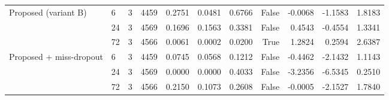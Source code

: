 \begin{table}
\begin{tabular}{llrrrrrrrrr}
\cline{1-11}
\multirow[t]{3}{*}{Proposed (variant B)} & 6 & 3 & 4459 & 0.2751 & 0.0481 & 0.6766 & False & -0.0068 & -1.1583 & 1.8183 \\
 & 24 & 3 & 4569 & 0.1696 & 0.1563 & 0.3381 & False & 0.4543 & -0.4554 & 1.3341 \\
 & 72 & 3 & 4566 & 0.0061 & 0.0002 & 0.0200 & True & 1.2824 & 0.2594 & 2.6387 \\
\cline{1-11}
\multirow[t]{3}{*}{Proposed + miss-dropout} & 6 & 3 & 4459 & 0.0745 & 0.0568 & 0.1212 & False & -0.4462 & -2.1432 & 1.1143 \\
 & 24 & 3 & 4569 & 0.0000 & 0.0000 & 0.4033 & False & -3.2356 & -6.5345 & 0.2510 \\
 & 72 & 3 & 4566 & 0.2150 & 0.1073 & 0.2608 & False & -0.0005 & -2.1527 & 1.7840 \\
\cline{1-11}
\bottomrule
\end{tabular}
\end{table}

